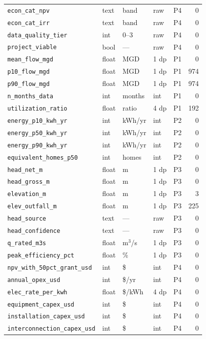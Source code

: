 \documentclass[12pt,letterpaper]{report}
\begin{document}
\begin{longtable}{@{}lllllr@{}}
\texttt{econ\_cat\_npv} & text & band & raw & P4 & 0 \\
\texttt{econ\_cat\_irr} & text & band & raw & P4 & 0 \\
\texttt{data\_quality\_tier} & int & 0--3 & raw & P4 & 0 \\
\texttt{project\_viable} & bool & --- & raw & P4 & 0 \\
\texttt{mean\_flow\_mgd} & float & MGD & 1 dp & P1 & 0 \\
\texttt{p10\_flow\_mgd} & float & MGD & 1 dp & P1 & 974 \\
\texttt{p90\_flow\_mgd} & float & MGD & 1 dp & P1 & 974 \\
\texttt{n\_months\_data} & int & months & int & P1 & 0 \\
\texttt{utilization\_ratio} & float & ratio & 4 dp & P1 & 192 \\
\texttt{energy\_p10\_kwh\_yr} & int & kWh/yr & int & P2 & 0 \\
\texttt{energy\_p50\_kwh\_yr} & int & kWh/yr & int & P2 & 0 \\
\texttt{energy\_p90\_kwh\_yr} & int & kWh/yr & int & P2 & 0 \\
\texttt{equivalent\_homes\_p50} & int & homes & int & P2 & 0 \\
\texttt{head\_net\_m} & float & m & 1 dp & P3 & 0 \\
\texttt{head\_gross\_m} & float & m & 1 dp & P3 & 0 \\
\texttt{elevation\_m} & float & m & 1 dp & P3 & 3 \\
\texttt{elev\_outfall\_m} & float & m & 1 dp & P3 & 225 \\
\texttt{head\_source} & text & --- & raw & P3 & 0 \\
\texttt{head\_confidence} & text & --- & raw & P3 & 0 \\
\texttt{q\_rated\_m3s} & float & m$^3$/s & 1 dp & P3 & 0 \\
\texttt{peak\_efficiency\_pct} & float & \% & 1 dp & P3 & 0 \\
\texttt{npv\_with\_50pct\_grant\_usd} & int & \$ & int & P4 & 0 \\
\texttt{annual\_opex\_usd} & int & \$/yr & int & P4 & 0 \\
\texttt{elec\_rate\_per\_kwh} & float & \$/kWh & 4 dp & P4 & 0 \\
\texttt{equipment\_capex\_usd} & int & \$ & int & P4 & 0 \\
\texttt{installation\_capex\_usd} & int & \$ & int & P4 & 0 \\
\texttt{interconnection\_capex\_usd} & int & \$ & int & P4 & 0 \\

\end{longtable}
\end{document}
